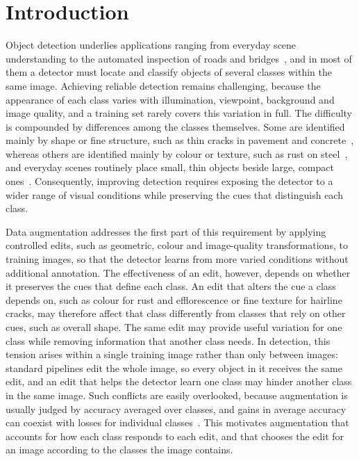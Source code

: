 \documentclass[conference]{IEEEtran}
\begin{document}
\section{Introduction}
\label{sec:intro}

Object detection underlies applications ranging from everyday scene understanding to the automated inspection of roads and bridges~\cite{everingham2010voc,shang2024automated,zheng2024deep,vision2025inspection}, and in most of them a detector must locate and classify objects of several classes within the same image. Achieving reliable detection remains challenging, because the appearance of each class varies with illumination, viewpoint, background and image quality, and a training set rarely covers this variation in full. The difficulty is compounded by differences among the classes themselves. Some are identified mainly by shape or fine structure, such as thin cracks in pavement and concrete~\cite{arya2024rdd,flotzinger2024dacl10k}, whereas others are identified mainly by colour or texture, such as rust on steel~\cite{flotzinger2024dacl10k}, and everyday scenes routinely place small, thin objects beside large, compact ones~\cite{everingham2010voc}. Consequently, improving detection requires exposing the detector to a wider range of visual conditions while preserving the cues that distinguish each class.

Data augmentation addresses the first part of this requirement by applying controlled edits, such as geometric, colour and image-quality transformations, to training images, so that the detector learns from more varied conditions without additional annotation. The effectiveness of an edit, however, depends on whether it preserves the cues that define each class. An edit that alters the cue a class depends on, such as colour for rust and efflorescence or fine texture for hairline cracks, may therefore affect that class differently from classes that rely on other cues, such as overall shape. The same edit may provide useful variation for one class while removing information that another class needs. In detection, this tension arises within a single training image rather than only between images: standard pipelines edit the whole image, so every object in it receives the same edit, and an edit that helps the detector learn one class may hinder another class in the same image. Such conflicts are easily overlooked, because augmentation is usually judged by accuracy averaged over classes, and gains in average accuracy can coexist with losses for individual classes~\cite{kirichenko2023}. This motivates augmentation that accounts for how each class responds to each edit, and that chooses the edit for an image according to the classes the image contains.
\end{document}
